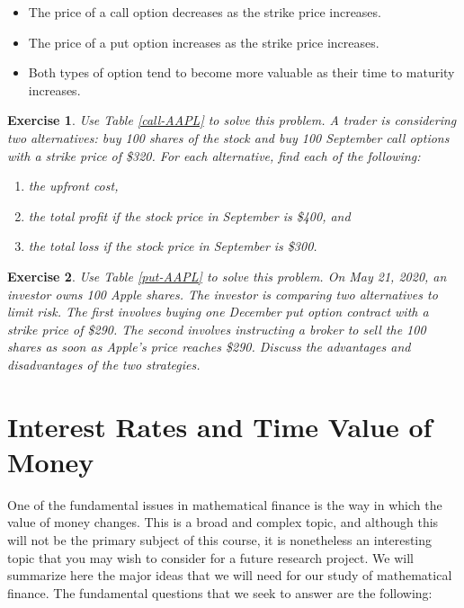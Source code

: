 \documentclass[letterpaper,10pt]{article}
\newtheorem{ex}{Exercise}
\begin{document}
\begin{itemize}

\item The price of a call option decreases as the strike price increases.

\item The price of a put option increases as the strike price increases. 

\item Both types of option tend to become more valuable as their time to maturity increases. 

\end{itemize}


\begin{ex}
Use Table \ref{call-AAPL} to solve this problem.  A trader is considering two alternatives: buy 100 shares of the stock and buy 100 September call options with a strike price of \$320.  For each alternative, find each of the following:
\begin{enumerate}
\item[(a)] the upfront cost,
\item[(b)] the total profit if the stock price in September is \$400, and 
\item[(c)] the total loss if the stock price in September is \$300. 
\end{enumerate}
\end{ex}


\begin{ex}
Use Table \ref{put-AAPL} to solve this problem.  On May 21, 2020, an investor owns 100 Apple shares.  The investor is comparing two alternatives to limit risk. The first involves buying one December put option contract with a strike price of \$290. The second involves instructing a broker to sell the 100 shares as soon as Apple’s price reaches \$290. Discuss the advantages and disadvantages of the two strategies.
\end{ex}


\newpage

\section{Interest Rates and Time Value of Money}

One of the fundamental issues in mathematical finance is the way in which the value of money changes.  This is a broad and complex topic, and although this will not be the primary subject of this course, it is nonetheless an interesting topic that you may wish to consider for a future research project.  We will summarize here the major ideas that we will need for our study of mathematical finance.  The fundamental questions that we seek to answer are the following:
\end{document}
